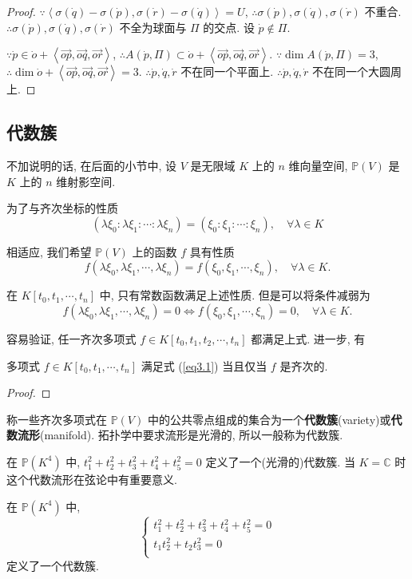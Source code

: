 \documentclass{ctexart}
\begin{document}
\begin{proof}
    $\because\left<\sigma(\dot{q})-\sigma(\dot{p}),\sigma(\dot{r})-\sigma(\dot{q})\right>=U$, $\therefore\sigma(\dot{p}),\sigma(\dot{q}),\sigma(\dot{r})$ 不重合. $\therefore\sigma(\dot{p}),\sigma(\dot{q}),\sigma(\dot{r})$ 不全为球面与 $\varPi$ 的交点. 设 $\dot{p}\notin\varPi$.
    
    $\because\dot{p}\in\dot{o}+\left<\overrightarrow{op},\overrightarrow{oq},\overrightarrow{or}\right>$, $\therefore A(\dot{p},\varPi)\subset\dot{o}+\left<\overrightarrow{op},\overrightarrow{oq},\overrightarrow{or}\right>$. $\because\dim A(\dot{p},\varPi)=3$, $\therefore\dim\dot{o}+\left<\overrightarrow{op},\overrightarrow{oq},\overrightarrow{or}\right>=3$. $\therefore\dot{p},\dot{q},\dot{r}$ 不在同一个平面上. $\therefore\dot{p},\dot{q},\dot{r}$ 不在同一个大圆周上.
\end{proof}
\subsection{代数簇}
不加说明的话, 在后面的小节中, 设 $V$ 是无限域 $K$ 上的 $n$ 维向量空间, $\mathbb{P}(V)$ 是 $K$ 上的 $n$ 维射影空间.

为了与齐次坐标的性质
\[(\lambda\xi_0:\lambda\xi_1:\cdots:\lambda\xi_n)=(\xi_0:\xi_1:\cdots:\xi_n),\quad\forall\lambda\in K\]

相适应, 我们希望 $\mathbb{P}(V)$ 上的函数 $f$ 具有性质
\[f(\lambda\xi_0,\lambda\xi_1,\cdots,\lambda\xi_n)=f(\xi_0,\xi_1,\cdots,\xi_n),\quad\forall\lambda\in K.\]

在 $K[t_0,t_1,\cdots,t_n]$ 中, 只有常数函数满足上述性质. 但是可以将条件减弱为
\begin{equation}\label{eq3.1}
    f(\lambda\xi_0,\lambda\xi_1,\cdots,\lambda\xi_n)=0\Leftrightarrow f(\xi_0,\xi_1,\cdots,\xi_n)=0,\quad\forall\lambda\in K.
\end{equation}

容易验证, 任一齐次多项式 $f\in K[t_0,t_1,t_2,\cdots,t_n]$ 都满足上式. 进一步, 有
\begin{theorem}
    多项式 $f\in K[t_0,t_1,\cdots,t_n]$ 满足式 (\ref{eq3.1}) 当且仅当 $f$ 是齐次的.
\end{theorem}
\begin{proof}
    
\end{proof}
\begin{definition}
    称一些齐次多项式在 $\mathbb{P}(V)$ 中的公共零点组成的集合为一个\textbf{代数簇}(variety)或\textbf{代数流形}(manifold). 拓扑学中要求流形是光滑的, 所以一般称为代数簇.
\end{definition}
\begin{example}
    在 $\mathbb{P}(K^4)$ 中, $t_1^2+t_2^2+t_3^2+t_4^2+t_5^2=0$ 定义了一个(光滑的)代数簇. 当 $K=\mathbb{C}$ 时这个代数流形在弦论中有重要意义.
\end{example}
\begin{example}
    在 $\mathbb{P}(K^4)$ 中,
    \[\begin{cases}
        t_1^2+t_2^2+t_3^2+t_4^2+t_5^2=0 \\
        t_1t_2^2+t_2t_3^2=0 \\
    \end{cases}\]
    定义了一个代数簇.
\end{example}
\end{document}
